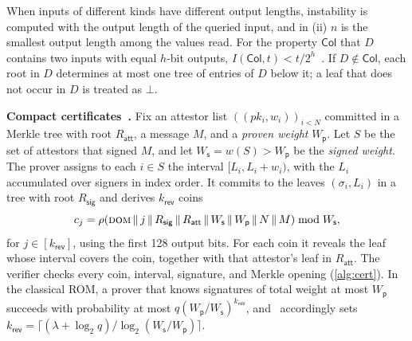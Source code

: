 \documentclass[10pt,journal,compsoc]{IEEEtran}
\theoremstyle{tplain}
\theoremstyle{tdef}
\theoremstyle{remark}
\newcommand{\Ws}{W_{\mathsf{s}}}
\newcommand{\Wp}{W_{\mathsf{p}}}
\newcommand{\Rsig}{R_{\mathsf{sig}}}
\newcommand{\Ratt}{R_{\mathsf{att}}}
\newcommand{\kr}{k_{\mathsf{rev}}}
\newcommand{\RO}{\rho}
\begin{document}
\noindent When inputs of different kinds have different output lengths, instability is computed with the output length of the queried input, and in (ii) $n$ is the smallest output length among the values read. For the property $\mathsf{Col}$ that $D$ contains two inputs with equal $h$-bit outputs, $I(\mathsf{Col},t)<t/2^h$~\cite[Sec.~2.5]{chiesa2019qrom}. If $D\notin\mathsf{Col}$, each root in $D$ determines at most one tree of entries of $D$ below it; a leaf that does not occur in $D$ is treated as $\bot$.

\noindent\textbf{Compact certificates~\cite{micali2020compact}.} Fix an attestor list $((pk_i,w_i))_{i<N}$ committed in a Merkle tree with root $\Ratt$, a message $M$, and a \emph{proven weight} $\Wp$. Let $S$ be the set of attestors that signed $M$, and let $\Ws=w(S)>\Wp$ be the \emph{signed weight}. The prover assigns to each $i\in S$ the interval $[L_i,L_i+w_i)$, with the $L_i$ accumulated over signers in index order. It commits to the leaves $(\sigma_i,L_i)$ in a tree with root $\Rsig$ and derives $\kr$ coins
\begin{equation}\label{eq:coin}
c_j=\RO(\textsc{dom}\,\|\,j\,\|\,\Rsig\,\|\,\Ratt\,\|\,\Ws\,\|\,\Wp\,\|\,N\,\|\,M)\bmod \Ws ,
\end{equation}
for $j\in[\kr]$, using the first 128 output bits. For each coin it reveals the leaf whose interval covers the coin, together with that attestor's leaf in $\Ratt$. The verifier checks every coin, interval, signature, and Merkle opening (\cref{alg:cert}). In the classical ROM, a prover that knows signatures of total weight at most $\Wp$ succeeds with probability at most $q(\Wp/\Ws)^{\kr}$, and~\cite{micali2020compact} accordingly sets $\kr=\lceil(\lambda+\log_2 q)/\log_2(\Ws/\Wp)\rceil$.
\end{document}
